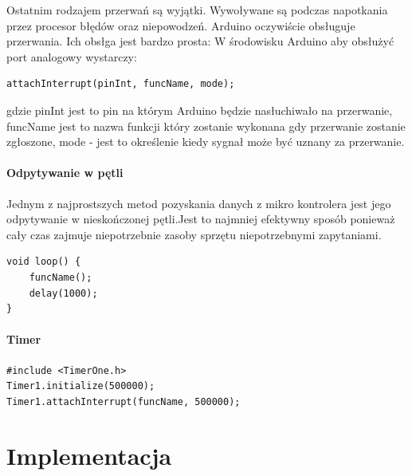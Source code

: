 \documentclass{xmgr}
\begin{document}
Ostatnim rodzajem przerwań są wyjątki. Wywoływane są podczas napotkania przez procesor błędów oraz niepowodzeń. Arduino oczywiście obsługuje przerwania. Ich obsłga jest bardzo prosta:
W środowisku Arduino aby obsłużyć port analogowy wystarczy:

\begin{lstlisting}[label=bot-dirs-alg,caption=Obsługa przerwań sprzętowych w środowisku Arduino]
attachInterrupt(pinInt, funcName, mode);
\end{lstlisting}
gdzie pinInt jest to pin na którym Arduino będzie nasłuchiwało na przerwanie, funcName jest to nazwa funkcji który zostanie wykonana gdy przerwanie zostanie zgłoszone, mode - jest to określenie kiedy sygnał może być uznany za przerwanie.

\subsubsection{Odpytywanie w pętli}
Jednym z najprostszych metod pozyskania danych z mikro kontrolera jest jego odpytywanie w nieskończonej pętli.Jest to najmniej efektywny sposób ponieważ cały czas zajmuje niepotrzebnie zasoby sprzętu niepotrzebnymi zapytaniami.

\begin{lstlisting}[label=bot-dirs-alg,caption=Odpytywanie w nieskończonej pętli w środowisku Arduino]
void loop() {
	funcName();
	delay(1000);
}
\end{lstlisting}

\subsubsection{Timer}
\begin{lstlisting}[label=bot-dirs-alg,caption=Przykładowe użycie timer w środowisku Arduino]
#include <TimerOne.h>
Timer1.initialize(500000);
Timer1.attachInterrupt(funcName, 500000);
\end{lstlisting}


\chapter{Implementacja}
\end{document}
